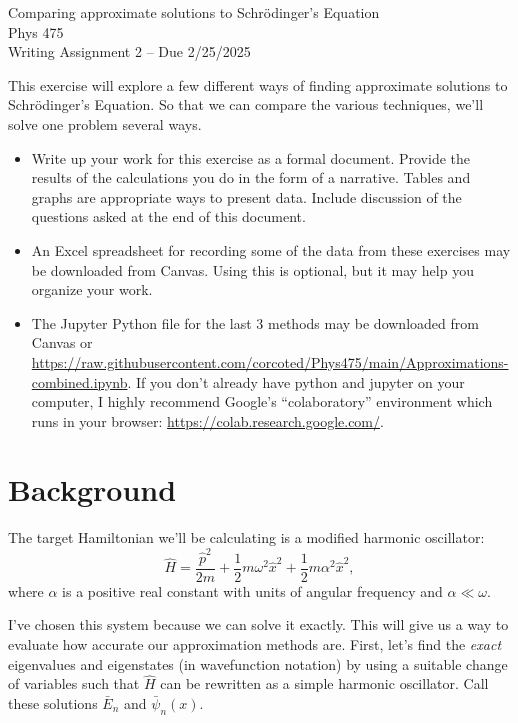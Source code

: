 \documentclass[fontsize=11pt,paper=letter,twoside=false,onecolumn]{article} %
\title{\mytitle}
\author{\myauthor}
\date{\mydate} %
\newcommand{\mytitle}{Comparing approximate solutions to Schr\"odinger's Equation}
\newcommand{\myauthor}{Phys 475}
\newcommand{\mydate}{Writing Assignment 2 -- Due 2/25/2025}
\begin{document}
\thispagestyle{plain}
{\centering
{\LARGE \mytitle} \\
{\large \myauthor \\ \mydate}

}


This exercise will explore a few different ways of finding approximate solutions to Schr\"odinger's Equation.  So that we can compare the various techniques, we'll solve one problem several ways.

\begin{itemize}
\item Write up your work for this exercise as a formal document.  Provide the results of the calculations you do in the form of a narrative.  Tables and graphs are appropriate ways to present data. Include discussion of the questions asked at the end of this document.
\item An Excel spreadsheet for recording some of the data from these exercises may be downloaded from Canvas.  Using this is optional, but it may help you organize your work.
\item The Jupyter Python file for the last 3 methods may be downloaded from Canvas or\\ \href{https://raw.githubusercontent.com/corcoted/Phys475/main/Approximations-combined.ipynb}{https://raw.githubusercontent.com/corcoted/Phys475/main/Approximations-combined.ipynb}.  If you don't already have python and jupyter on your computer, I highly recommend Google's ``colaboratory'' environment which runs in your browser: \href{https://colab.research.google.com/}{https://colab.research.google.com/}.
\end{itemize}

\tableofcontents

\section{Background}
The target Hamiltonian we'll be calculating is a modified harmonic oscillator:
\[
\hat{H} = \frac{\hat{p}^2}{2m} + \frac12 m\omega^2 \hat{x}^2 + \frac12 m \alpha^2\hat{x}^2,
\]
where $\alpha$ is a positive real constant with units of angular frequency and $\alpha \ll \omega$.

I've chosen this system because we can solve it exactly.  This will give us a way to evaluate how accurate our approximation methods are.  First, let's find the \emph{exact} eigenvalues and eigenstates (in wavefunction notation) by using a suitable change of variables such that $\hat{H}$ can be rewritten as a simple harmonic oscillator.  Call these solutions $\bar{E}_n$ and $\bar{\psi}_n(x)$.
\end{document}
